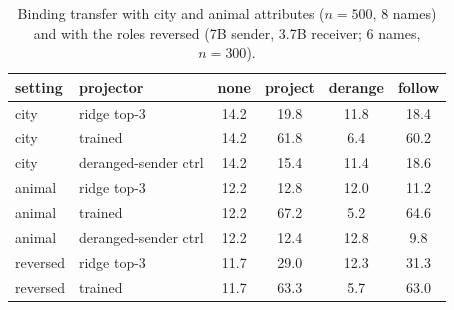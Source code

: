 \documentclass{article}
\begin{document}
\begin{table}[h]
\caption{Binding transfer with city and animal attributes ($n = 500$, 8 names) and with the roles reversed (7B sender, 3.7B receiver; 6 names, $n = 300$).}
\label{tab:attrs}
\vskip 0.1in
\begin{center}
\begin{small}
\begin{tabular}{llcccc}
\toprule
setting & projector & none & project & derange & follow \\
\midrule
city   & ridge top-3            & 14.2 & 19.8 & 11.8 & 18.4 \\
city   & trained                & 14.2 & 61.8 & 6.4  & 60.2 \\
city   & deranged-sender ctrl   & 14.2 & 15.4 & 11.4 & 18.6 \\
animal & ridge top-3            & 12.2 & 12.8 & 12.0 & 11.2 \\
animal & trained                & 12.2 & 67.2 & 5.2  & 64.6 \\
animal & deranged-sender ctrl   & 12.2 & 12.4 & 12.8 & 9.8 \\
reversed & ridge top-3          & 11.7 & 29.0 & 12.3 & 31.3 \\
reversed & trained              & 11.7 & 63.3 & 5.7  & 63.0 \\
\bottomrule
\end{tabular}
\end{small}
\end{center}
\end{table}
\end{document}
